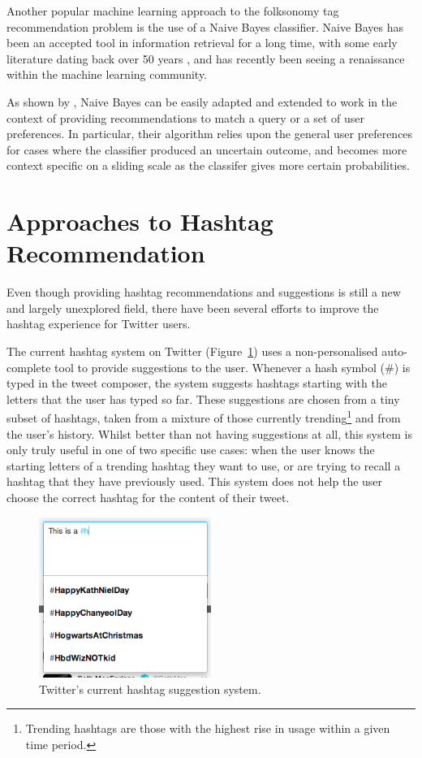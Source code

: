 \documentclass[11pt,a4paper]{report}
\begin{document}
Another popular machine learning approach to the folksonomy tag recommendation problem is the use of a Naive Bayes classifier. Naive Bayes has been an accepted tool in information retrieval for a long time, with some early literature dating back over 50 years \parencite{Maron:1960}, and has recently been seeing a renaissance within the machine learning community.

As shown by \textcite{DePessemier:2010}, Naive Bayes can be easily adapted and extended to work in the context of providing recommendations to match a query or a set of user preferences. In particular, their algorithm relies upon the general user preferences for cases where the classifier produced an uncertain outcome, and becomes more context specific on a sliding scale as the classifer gives more certain probabilities.

\section{Approaches to Hashtag Recommendation}
Even though providing hashtag recommendations and suggestions is still a new and largely unexplored field, there have been several efforts to improve the hashtag experience for Twitter users.

The current hashtag system on Twitter (Figure~\ref{fig:twittersuggest}) uses a non-personalised auto-complete tool to provide suggestions to the user. Whenever a hash symbol (\#) is typed in the tweet composer, the system suggests hashtags starting with the letters that the user has typed so far. These suggestions are chosen from a tiny subset of hashtags, taken from a mixture of those currently trending\footnote{Trending hashtags are those with the highest rise in usage within a given time period.} and from the user's history. Whilst better than not having suggestions at all, this system is only truly useful in one of two specific use cases: when the user knows the starting letters of a trending hashtag they want to use, or are trying to recall a hashtag that they have previously used. This system does not help the user choose the correct hashtag for the content of their tweet.

\begin{figure}[htpb]
    \centering
    \includegraphics[width=0.5\textwidth]{twittersuggest.png}
    \caption{Twitter's current hashtag suggestion system.\label{fig:twittersuggest}}
\end{figure}
\end{document}
